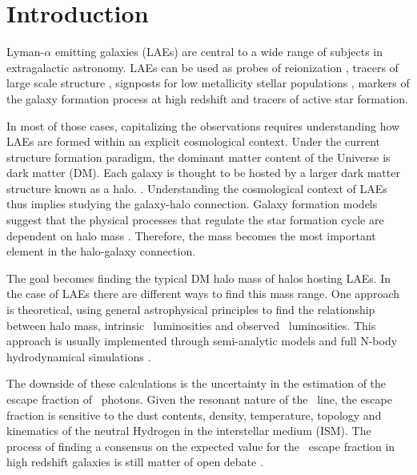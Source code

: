 \documentclass{emulateapj}
\newcommand{\ly}{{\ifmmode{{\rm Ly}\alpha}\else{Ly$\alpha$}\fi}}
\begin{document}

\section{Introduction}
\label{sec:introduction}

Lyman-$\alpha$ emitting galaxies (LAEs) are central to a wide range
of subjects in extragalactic astronomy. 
LAEs can be used as probes of reionization \citep[for a recent review
  see][and references therein]{Dijkstra14}, tracers  of large scale structure
\citep{Koehler2007}, signposts for low metallicity stellar
populations \citep[for a recent review see][and references
  therein]{Hayes15}, markers of the galaxy formation process at high
redshift \citep{Partridge67,Rhoads00,Blanc11} and tracers of active
star formation.    
 
In most of those cases, capitalizing the observations requires
understanding how LAEs are formed within an explicit cosmological
context.  
Under the current structure formation paradigm, the dominant matter
content of the Universe is dark matter (DM).  
Each galaxy is thought to be hosted by a larger dark matter structure
known as a halo. \citep{Peebles1980,SpringelNature05}.  
Understanding the cosmological context of LAEs thus implies studying
the galaxy-halo connection.  
Galaxy formation models suggest that the physical processes that
regulate the star formation cycle are dependent on halo mass
\citep[e.g.][]{Behroozi2013a}. Therefore, the mass becomes 
the most important element in the halo-galaxy connection.  
   
The goal becomes finding the typical DM halo mass of halos hosting LAEs.
In the case of LAEs there are different ways to find this mass range.
One approach is theoretical, using general astrophysical principles to
find the relationship between halo mass, intrinsic \ly\ luminosities
and observed \ly\ luminosities. 
This approach is usually implemented through semi-analytic models
\citep{Garel2012,Orsi2012} and  full N-body hydrodynamical simulations
\citep{Laursen2007, Dayal2009, ForeroRomero2011, Yajima2012}.  

The downside of these calculations is the uncertainty in the
estimation of the escape fraction of \ly\ photons. 
Given the resonant nature of the \ly\ line, the escape fraction is
sensitive to  the dust contents, density, temperature, topology and
kinematics of the neutral Hydrogen in the interstellar medium (ISM). 
The process of finding a consensus on the expected value for the
\ly\ escape fraction in high redshift galaxies is still matter of open
debate
\citep{Neufeld1991,Verhamme2006,ForeroRomero2012,Dijkstra2012,Laursen2013,Orsi2012,Yajima14}.       
\end{document}

